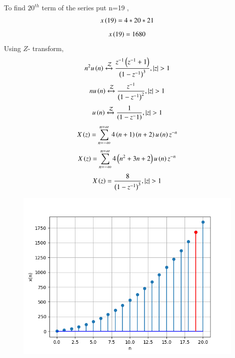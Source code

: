 \documentclass[beamer]{IEEEtran}
\theoremstyle{remark}
\begin{document}
To find $20^{th}$ term of the series put n=19 ,
\begin{align}
    x\left(19\right)=4*20*21
\end{align}
\begin{align}
    x\left(19\right)=1680
\end{align}
Using $Z$- transform,
\begin{align}
	n^2 u\left(n\right)\xleftrightarrow{\mathcal{Z}} \frac{z^{-1}\left(z^{-1}+1\right)}{\left(1-z^{-1}\right)^3} ,  \left\vert z\right\vert > 1
\end{align}
\begin{align}
	n u\left(n\right)\xleftrightarrow{\mathcal{Z}} \frac{z^{-1}}{\left(1-z^{-1}\right)^2} ,   \left\vert z\right\vert >1 
\end{align}
\begin{align}
	u\left(n\right)\xleftrightarrow{\mathcal{Z}} \frac{1}{\left(1-z^-1\right)} ,   \left\vert z\right\vert >1 
\end{align}
\begin{align}
    X\left(z\right)=\sum_{n=-\infty}^{n=\infty}4\left(n+1\right)\left(n+2\right)u\left(n\right)z^{-n}
\end{align}
\begin{align}
	X\left(z\right)=\sum_{n=-\infty}^{n=\infty}4\left(n^2+3n+2\right)u\left(n\right)z^{-n}
\end{align}
\begin{align}
	X\left(z\right)=\frac{8}{\left(1-z^{-1}\right)^3} , \left\vert z\right\vert >1
\end{align}
\begin{figure}[ht]
    \centering
    \includegraphics[width=1\columnwidth]{graphs/digital2_graph.png}
    
	\label{fig:11.9.5.22.1}
\end{figure}
\end{document}
